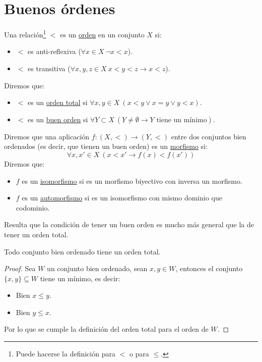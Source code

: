 \section{Buenos órdenes}
\begin{definicion}
    Una relación\footnote{Puede hacerse la definición para $<$ o para $\leq$.} $<$ es un \underline{orden} en un conjunto $X$ si:
    \begin{itemize}
        \item $<$ es anti-reflexiva ($\forall x\in X\ \lnot x<x$).
        \item $<$ es transitiva ($\forall x,y,z\in X\ x<y<z \rightarrow x<z$).
    \end{itemize}
    Diremos que:
    \begin{itemize}
        \item $<$ es un \underline{orden total} si $\forall x,y\in X\ (x < y \lor x = y \lor y < x)$.
        \item $<$ es un \underline{buen orden} si $\forall Y\subset X\ (Y\neq \emptyset  \rightarrow Y \text{\ tiene un mínimo})$.
    \end{itemize}
    Diremos que una aplicación $f:(X,<)\to (Y,<)$ entre dos conjuntos bien ordenados (es decir, que tienen un buen orden) es un \underline{morfismo} si:
    \begin{equation*}
        \forall x,x'\in X\ (x<x'\rightarrow f(x)<f(x'))
    \end{equation*}
    Diremos que:
    \begin{itemize}
        \item $f$ es un \underline{isomorfismo} si es un morfismo biyectivo con inversa un morfismo.
        \item $f$ es un \underline{automorfismo} si es un isomorfismo con mismo dominio que codominio.
    \end{itemize}
\end{definicion}

\noindent
Resulta que la condición de tener un buen orden es mucho más general que la de tener un orden total.

\begin{prop}
    Todo conjunto bien ordenado tiene un orden total.
    \begin{proof}
        Sea $W$ un conjunto bien ordenado, sean $x,y\in W$, entonces el conjunto $\{x,y\} \subseteq W$ tiene un mínimo, es decir:
        \begin{itemize}
            \item Bien $x\leq y$.
            \item Bien $y\leq x$.
        \end{itemize}
        Por lo que se cumple la definición del orden total para el orden de $W$.
    \end{proof}
\end{prop}

